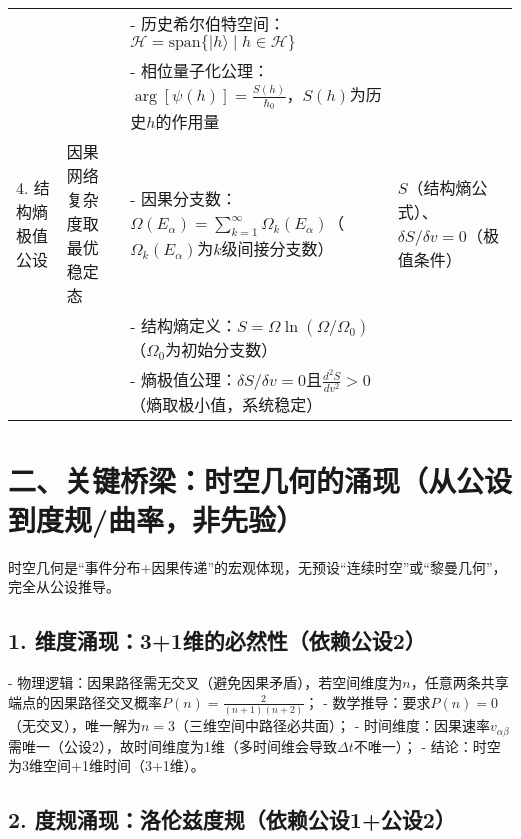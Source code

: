 \documentclass{article}
\begin{document}
\begin{table}[h!]
{\begin{tabular}{l l l l}
                        &                                 & - 历史希尔伯特空间：$\mathcal{H} = \text{span}\{|h\rangle \mid h \in \mathcal{H}\}$         &                                              \\
                        &                                 & - 相位量子化公理：$\arg[\psi(h)] = \frac{S(h)}{\hbar_0}$，$S(h)$为历史$h$的作用量          &                                              \\
\midrule
4. 结构熵极值公设       & 因果网络复杂度取最优稳定态     & - 因果分支数：$\Omega(E_\alpha) = \sum_{k=1}^\infty \Omega_k(E_\alpha)$（$\Omega_k(E_\alpha)$为$k$级间接分支数） & $S$（结构熵公式）、$\delta S/\delta v = 0$（极值条件） \\
                        &                                 & - 结构熵定义：$S = \Omega \ln(\Omega/\Omega_0)$（$\Omega_0$为初始分支数）                    &                                              \\
                        &                                 & - 熵极值公理：$\delta S/\delta v = 0$且$\frac{d^2S}{dv^2} > 0$（熵取极小值，系统稳定）      &                                              \\
\bottomrule
\end{tabular}%
}
\end{table}

\section*{二、关键桥梁：时空几何的涌现（从公设到度规/曲率，非先验）}

时空几何是“事件分布+因果传递”的宏观体现，无预设“连续时空”或“黎曼几何”，完全从公设推导。

\subsection*{1. 维度涌现：3+1维的必然性（依赖公设2）}

- 物理逻辑：因果路径需无交叉（避免因果矛盾），若空间维度为$n$，任意两条共享端点的因果路径交叉概率$P(n)=\frac{2}{(n+1)(n+2)}$；
- 数学推导：要求$P(n)=0$（无交叉），唯一解为$n=3$（三维空间中路径必共面）；
- 时间维度：因果速率$v_{\alpha\beta}$需唯一（公设2），故时间维度为1维（多时间维会导致$\Delta t$不唯一）；
- 结论：时空为3维空间+1维时间（3+1维）。

\subsection*{2. 度规涌现：洛伦兹度规（依赖公设1+公设2）}
\end{document}
